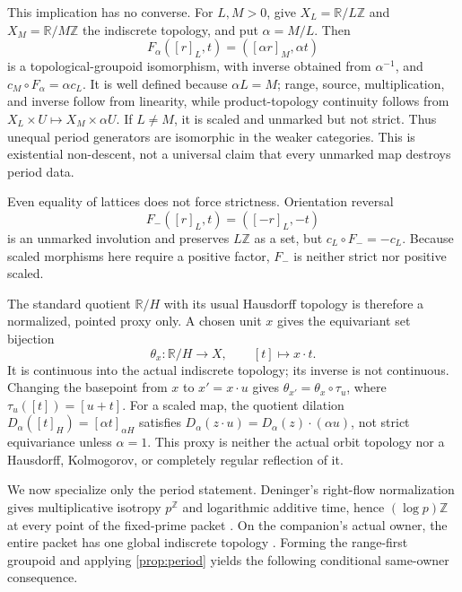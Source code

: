 \documentclass[11pt]{article}
\theoremstyle{definition}
\newcommand{\R}{\mathbb R}
\newcommand{\Z}{\mathbb Z}
\begin{document}
This implication has no converse.  For $L,M>0$, give $X_L=\R/L\Z$ and
$X_M=\R/M\Z$ the indiscrete topology, and put $\alpha=M/L$.  Then
\begin{equation}
\label{eq:dilation}
 F_\alpha([r]_L,t)=([\alpha r]_M,\alpha t)
\end{equation}
is a topological-groupoid isomorphism, with inverse obtained from
$\alpha^{-1}$, and $c_M\circ F_\alpha=\alpha c_L$.  It is well defined
because $\alpha L=M$; range, source, multiplication, and inverse follow from
linearity, while product-topology continuity follows from
$X_L\times U\mapsto X_M\times\alpha U$.  If $L\neq M$, it is scaled and
unmarked but not strict.  Thus unequal period generators are isomorphic in
the weaker categories.  This is existential non-descent, not a universal
claim that every unmarked map destroys period data.

Even equality of lattices does not force strictness.  Orientation reversal
\begin{equation}
\label{eq:orientation-reversal}
 F_-([r]_L,t)=([-r]_L,-t)
\end{equation}
is an unmarked involution and preserves $L\Z$ as a set, but
$c_L\circ F_-=-c_L$.  Because scaled morphisms here require a positive
factor, $F_-$ is neither strict nor positive scaled.

The standard quotient $\R/H$ with its usual Hausdorff topology is therefore
a normalized, pointed proxy only.  A chosen unit $x$ gives the equivariant
set bijection
\begin{equation}
\label{eq:pointed-chart}
 \theta_x:\R/H\longrightarrow X,\qquad [t]\longmapsto x\mathbin{\cdot}t.
\end{equation}
It is continuous into the actual indiscrete topology; its inverse is not
continuous.  Changing the basepoint from $x$ to
$x'=x\mathbin{\cdot}u$ gives
$\theta_{x'}=\theta_x\circ\tau_u$, where
$\tau_u([t])=[u+t]$.  For a scaled map, the quotient dilation
$D_\alpha([t]_H)=[\alpha t]_{\alpha H}$ satisfies
$D_\alpha(z\cdot u)=D_\alpha(z)\cdot(\alpha u)$, not strict equivariance
unless $\alpha=1$.  This proxy is neither the actual orbit topology nor a
Hausdorff, Kolmogorov, or completely regular reflection of it.

We now specialize only the period statement.  Deninger's right-flow
normalization gives multiplicative isotropy $p^{\Z}$ and logarithmic additive
time, hence $(\log p)\Z$ at every point of the fixed-prime packet
\cite[arXiv v4, physical pp.~38--39, Theorem~6.1]{Deninger2026Dynamical}.
On the companion's actual owner, the entire packet has one global
indiscrete topology \cite{Wang2026PacketSeparation}.  Forming the range-first
groupoid and applying \cref{prop:period} yields the following conditional
same-owner consequence.
\end{document}
